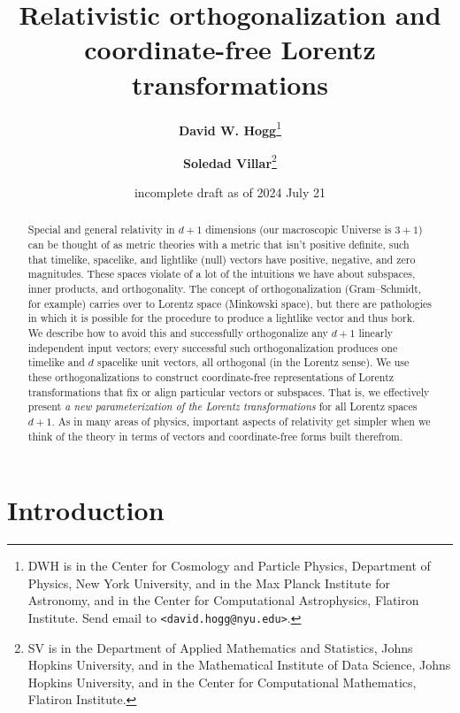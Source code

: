 \documentclass{article}
\title{\bfseries Relativistic orthogonalization and coordinate-free Lorentz transformations}
\author{\textbf{David W. Hogg}\footnote{DWH is in the Center for Cosmology and Particle Physics, Department of Physics, New York University, and in the Max Planck Institute for Astronomy, and in the Center for Computational Astrophysics, Flatiron Institute. Send email to \texttt{<david.hogg@nyu.edu>}.}
        \and
        \textbf{Soledad Villar}\footnote{SV is in the Department of Applied Mathematics and Statistics, Johns Hopkins University, and in the Mathematical Institute of Data Science, Johns Hopkins University, and in the Center for Computational Mathematics, Flatiron Institute.}}
\date{incomplete draft as of 2024 July 21}
\newcommand{\plus}{\!+\!} %
\begin{document}
\thispagestyle{plain}
\maketitle

\begin{abstract}\noindent
    Special and general relativity in $d\plus1$ dimensions (our macroscopic Universe is $3\plus1$) can be thought of as metric theories with a metric that isn't positive definite, such that timelike, spacelike, and lightlike (null) vectors have positive, negative, and zero magnitudes.
    These spaces violate of a lot of the intuitions we have about subspaces, inner products, and orthogonality.
    The concept of orthogonalization (Gram--Schmidt, for example) carries over to Lorentz space (Minkowski space), but there are pathologies in which it is possible for the procedure to produce a lightlike vector and thus bork.
    We describe how to avoid this and successfully orthogonalize any $d+1$ linearly independent input vectors; every successful such orthogonalization produces one timelike and $d$ spacelike unit vectors, all orthogonal (in the Lorentz sense).
    We use these orthogonalizations to construct coordinate-free representations of Lorentz transformations that fix or align particular vectors or subspaces.
    That is, we effectively present \emph{a new parameterization of the Lorentz transformations} for all Lorentz spaces $d\plus1$.
    As in many areas of physics, important aspects of relativity get simpler when we think of the theory in terms of vectors and coordinate-free forms built therefrom.
\end{abstract}

\section{Introduction}\label{sec:intro}
\end{document}
